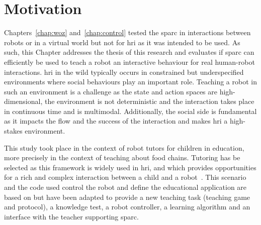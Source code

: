 \newpage

\section{Motivation}

Chapters~\ref{chap:woz} and~\ref{chap:control} tested the \gls{sparc} in interactions between robots or in a virtual world but not for \gls{hri} as it was intended to be used. As such, this Chapter addresses the thesis of this research and evaluates if \gls{sparc} can efficiently be used to teach a robot an interactive behaviour for real human-robot interactions. \gls{hri} in the wild typically occurs in constrained but underspecified environments where social behaviours play an important role. Teaching a robot in such an environment is a challenge as the state and action spaces are high-dimensional, the environment is not deterministic and the interaction takes place in continuous time and is multimodal. Additionally, the social side is fundamental as it impacts the flow and the success of the interaction and makes \gls{hri} a high-stakes environment.%

This study took place in the context of robot tutors for children in education, more precisely in the context of teaching about food chains. Tutoring has be selected as this framework is widely used in \gls{hri}, and which provides opportunities for a rich and complex interaction between a child and a robot~\citep{leyzberg2012physical,kennedy2015robot}. This scenario and the code used control the robot and define the educational application are based on \cite{lemaignan2017free} but have been adapted to provide a new teaching task (teaching game and protocol), a knowledge test, a robot controller, a learning algorithm and an interface with the teacher supporting \gls{sparc}.


